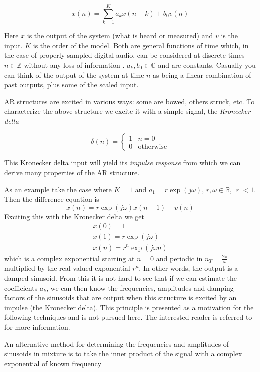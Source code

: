 \[
    x(n) = \sum_{k=1}^{K} a_k x(n-k) + b_0 v(n)
\]

Here $x$ is the output of the system (what is heard or measured) and $v$ is the
input. $K$ is the order of the model. Both are general functions of time which,
in the case of properly sampled digital audio, can be considered at discrete
times $n \in \mathbb{Z}$ without any loss of information
\cite[ch.~2]{crochiere1983multi}.  $a_k,b_0 \in \mathbb{C}$ and are constants.
Casually you can think of the output of the system at
time $n$ as being a linear combination of past outputs, plus some of the scaled
input.

AR structures are excited in various ways: some are bowed, others struck, etc.
To characterize the above structure we excite it with a simple signal, the
\textit{Kronecker delta}

\[
    \delta(n) = \begin{cases}
        1 & n=0\\
        0 & \text{otherwise}
    \end{cases}
\]

This Kronecker delta input will yield its \textit{impulse
response} from which we can derive many properties of the AR structure.

As an example take the case where $K=1$ and $a_1 = r \exp(j\omega)$, 
$r, \omega \in \mathbb{R}$, $|r|<1$. Then the difference equation is
\[
    x(n) = r \exp(j\omega) x(n-1) + v(n)
\]
Exciting this with the Kronecker delta we get
\[
    \begin{array}{c}
        x(0) = 1 \\
        x(1) = r \exp(j\omega) \\
        x(n) = r^n \exp(j\omega n)
    \end{array}
\]
which is a complex exponential starting at $n=0$ and periodic in
$n_T=\frac{2\pi}{\omega}$ multiplied by the real-valued
exponential $r^n$. In other words, the output is a damped sinusoid. From this
it is not hard to see that if we can estimate the coefficients $a_k$, we can
then know the frequencies, amplitudes and damping factors of the sinusoids that
are output when this structure is excited by an impulse (the Kronecker delta).
This principle is presented as a motivation for the following techniques and is
not pursued here. The interested reader is referred to \cite{makhoul1975linear}
for more information.

An alternative method for determining the frequencies and amplitudes of
sinusoids in mixture is to take the inner product of the signal with a complex
exponential of known frequency


